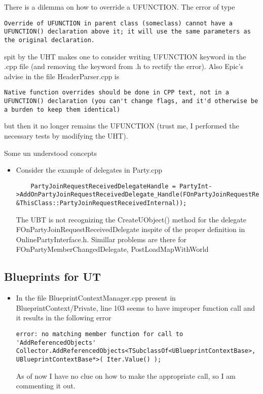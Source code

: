 \documentclass{article}
\begin{document}
There is a dilemma on how to override a UFUNCTION.  The error of type
\lstset{language=c++} 
\begin{lstlisting}[frame=single]
Override of UFUNCTION in parent class (someclass) cannot have a UFUNCTION() declaration above it; it will use the same parameters as the original declaration.
\end{lstlisting}
spit by the UHT makes one to consider writing UFUNCTION keyword in the .cpp file (and removing the keyword from .h to rectify the error).  Also Epic's advise in the file {\color{filecolor}HeaderParser.cpp} is
\lstset{language=c++} 
\begin{lstlisting}[frame=single]
Native function overrides should be done in CPP text, not in a UFUNCTION() declaration (you can't change flags, and it'd otherwise be a burden to keep them identical)
\end{lstlisting}
but then it no longer remains the UFUNCTION (trust me, I performed the necessary tests by modifying the UHT).

Some un understood concepts
\begin{itemize}
\item Consider the example of delegates in {\color{filecolor}Party.cpp}
\lstset{language=c++}
  \begin{lstlisting}
    PartyJoinRequestReceivedDelegateHandle = PartyInt->AddOnPartyJoinRequestReceivedDelegate_Handle(FOnPartyJoinRequestReceivedDelegate::CreateUObject(this, &ThisClass::PartyJoinRequestReceivedInternal));
  \end{lstlisting}
  The UBT is not recognizing the CreateUObject() method for the delegate FOnPartyJoinRequestReceivedDelegate inspite of the proper definition in {\color{filecolor}OnlinePartyInterface.h}.  Simillar problems are there for FOnPartyMemberChangedDelegate, PostLoadMapWithWorld
\end{itemize}
\subsection{Blueprints for UT}
\begin{itemize}
\item In the file {\color{filecolor}BlueprintContextManager.cpp} present in {\ttfamily BlueprintContext/Private}, line 103 seems to have improper function call and it results in the following error
  \lstset{language=c++} 
\begin{lstlisting}[frame=single]
error: no matching member function for call to 'AddReferencedObjects' Collector.AddReferencedObjects<TSubclassOf<UBlueprintContextBase>, UBlueprintContextBase*>( Iter.Value() );
\end{lstlisting}
As of now I have no clue on how to make the appropriate call, so I am commenting it out.
\end{itemize}
\end{document}
